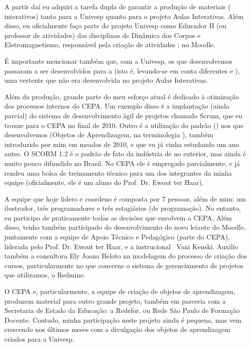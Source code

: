 A partir daí eu adquiri a tarefa dupla de garantir a produção de materiais ( interativos) tanto para a Univesp quanto para o projeto Aulas Interativas. Além disso, eu oficialmente faço parte do projeto Univesp como Educador II (ou professor de atividades) das disciplinas de Dinâmica dos Corpos e Eletromagnetismo, responsável pela criação de atividades ; no Moodle.

É importante mencionar também que, com a Univesp, os  que desenvolvemos passaram a ser desenvolvidos para a  (isto é, levando-se em conta diferentes  e ), uma vertente que não era desenvolvida no projeto Aulas Interativas.

Além da produção, grande parte do meu esforço atual é dedicado à otimização dos processos internos do CEPA. Um exemplo disso é a implantação (ainda parcial) do sistema de desenvolvimento ágil de projetos chamado Scrum, que eu trouxe para o CEPA no final de 2010. Outro é a utilização do padrão  () nos  que desenvolvemos (Objetos de Aprendizagem, na terminologia ), também introduzido por mim em meados de 2010, e que eu já vinha estudando um ano antes. O SCORM 1.2 é o padrão de fato da indústria de  no exterior, mas ainda é muito pouco difundido no Brasil. No CEPA ele é empregado parcialmente, e já rendeu uma bolsa de treinamento técnico para um dos integrantes da minha equipe (oficialmente, ele é um aluno do Prof. Dr. Ewout ter Haar).
 
A equipe que hoje lidero e coordeno é composta por 7 pessoas, além de mim: um ilustrador, três programadores e três estagiários (de programação). No entanto, eu participo de praticamente todas as decisões que envolvem o CEPA. Além disso, tenho também participado do desenvolvimento do novo leiaute do Moodle, juntamente com a equipe de Apoio Técnico e Pedagógico (parte do CEPA), liderada pelo Prof. Dr. Ewout ter Haar, e a  instrucional \profa\ Vani Kenski. Auxilio também a consultora Ely Joana Beloto na modelagem do processo de criação dos cursos, particularmente no que concerne o sistema de gerenciamento de projetos que utilizamos, o Redmine.

O CEPA e, particularmente, a equipe de criação de objetos de aprendizagem, produzem material para outro grande projeto, também em parceria com a Secretaria de Estado da Educação: a Redefor, ou Rede São Paulo de Formação Docente. Contudo, minha participação neste projeto ainda é pequena, mas vem crescendo nos últimos meses com a divulgação dos objetos de aprendizagem criados para a Univesp.

